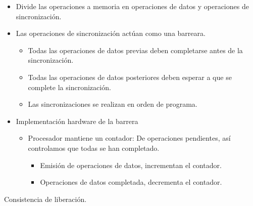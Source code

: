 \documentclass[12pt, twoside, openright]{report} %
\begin{document}
    \begin{itemize}
    
    \item
      Divide las operaciones a memoria en operaciones de datos y
      operaciones de sincronización.
    \item
      Las operaciones de sincronización actúan como una barreara.

      \begin{itemize}
      
      \item
        Todas las operaciones de datos previas deben completarse antes
        de la sincronización.
      \item
        Todas las operaciones de datos posteriores deben esperar a que
        se complete la sincronización.
      \item
        Las sincronizaciones se realizan en orden de programa.
      \end{itemize}
    \item
      Implementación hardware de la barrera

      \begin{itemize}
      
      \item
        Procesador mantiene un contador: De operaciones pendientes,
        así controlamos que todas se han completado.

        \begin{itemize}
        
        \item
          Emisión de operaciones de datos, incrementan el contador.
        \item
          Operaciones de datos completada, decrementa el contador.
        \end{itemize}
      \end{itemize}
    \end{itemize}

    Consistencia de liberación.
\end{document}
